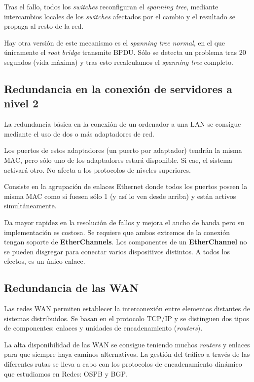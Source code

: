 Tras el fallo, todos los \textit{switches} reconfiguran el \textit{spanning tree}, mediante intercambios locales de los \textit{switches} afectados por el cambio y el resultado se propaga al resto de la red.

\obs Hay otra versión de este mecanismo es el \textit{spanning tree normal}, en el que únicamente el \textit{root bridge} transmite BPDU. Sólo se detecta un problema tras 20 segundos (vida máxima) y tras esto recalculamos el \textit{spanning tree} completo.

\subsection{Redundancia en la conexión de servidores a nivel 2}
La redundancia básica en la conexión de un ordenador a una LAN se consigue mediante el uso de dos o más adaptadores de red.

Los puertos de estos adaptadores (un puerto por adaptador) tendrán la misma MAC, pero sólo uno de los adaptadores estará disponible. Si cae, el sistema activará otro. No afecta a los protocolos de niveles superiores.

\begin{defn}[EtherChannels]
Consiste en la agrupación de enlaces Ethernet donde todos los puertos poseen la misma MAC como si fuesen sólo 1 (y así lo ven desde arriba) y están activos simultáneamente.

Da mayor rapidez en la resolución de fallos y mejora el ancho de banda pero su implementación es costosa. Se requiere que ambos extremos de la conexión tengan soporte de \textbf{EtherChannels}. Los componentes de un \textbf{EtherChannel} no se pueden disgregar para conectar varios dispositivos distintos. A todos los efectos, es un único enlace.

\end{defn}

\subsection{Redundancia de las WAN}
Las redes WAN permiten establecer la interconexión entre elementos distantes de sistemas distribuidos. Se basan en el protocolo TCP/IP y se distinguen dos tipos de componentes: enlaces y unidades de encadenamiento (\textit{routers}).

La alta disponibilidad de las WAN se consigue teniendo muchos \textit{routers} y enlaces para que siempre haya caminos alternativos. La gestión del tráfico a través de las diferentes rutas se lleva a cabo con los protocolos de encadenamiento dinámico que estudiamos en Redes: OSPB y BGP.


